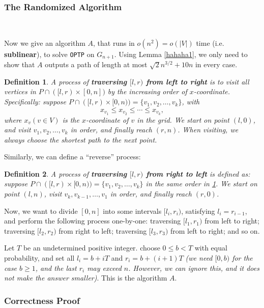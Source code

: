 \documentclass[11pt]{article}
\theoremstyle{plain}
\newtheorem{definition}{Definition}[section]
\begin{document}
\subsubsection{The Randomized Algorithm}\

Now we give an algorithm $A$, that runs in $o(n^2)=o(|V|)$ time (i.e. \textbf{sublinear}), to solve \texttt{OPTP} on $G_{n+1}$. Using Lemma \ref{hahaha1}, we only need to show that $A$ outputs a path of length at most $\sqrt{2}n^{3/2}+10n$ in every case.

\begin{definition}
    \label{def5.1}
A process of \textbf{traversing $[l,r)$ from left to right} is to visit all vertices in $P\cap ([l,r)\times [0,n])$ by the increasing order of $x$-coordinate. Specifically: suppose $P\cap ([l,r)\times [0,n))=\{v_1,v_2,\ldots,v_k\}$, with
$$x_{v_1}\le x_{v_2}\le \cdots\le x_{v_k},$$
where $x_{v}(v\in V)$ is the $x$-coordinate of $v$ in the grid. We start on point $(l,0)$, and visit $v_1,v_2,\ldots,v_k$ in order, and finally reach $(r,n)$. When visiting, we always choose the shortest path to the next point.
\end{definition}

Similarly, we can define a ``reverse'' process:
\begin{definition}
A process of \textbf{traversing $[l,r)$ from right to left} is defined as: suppose $P\cap ([l,r)\times [0,n))=\{v_1,v_2,\ldots,v_k\}$ in the same order in \ref{def5.1}. We start on point $(l,n)$, visit $v_k,v_{k-1},\ldots,v_1$ in order, and finally reach $(r,0)$.
\end{definition}

Now, we want to divide $[0,n]$ into some intervals $[l_i,r_i)$, satisfying $l_i=r_{i-1}$, and perform the following process one-by-one: traversing $[l_1,r_1)$ from left to right; traversing $[l_2,r_2)$ from right to left; traversing $[l_3,r_3)$ from left to right; and so on. 

Let $T$ be an undetermined positive integer.  choose $0\le b<T$ with equal probability, and set all $l_i=b+iT$ and $r_i=b+(i+1)T$ \textit{(we need $[0,b)$ for the case $b\ge 1$, and the last $r_i$ may exceed $n$. However, we can ignore this, and it does not make the answer smaller)}. This is the algorithm $A$. 

\subsubsection{Correctness Proof}\
\end{document}
